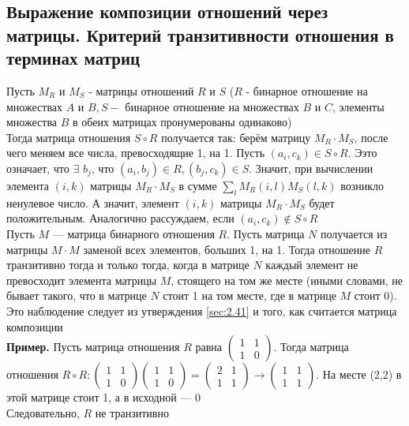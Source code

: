 \documentclass[a4paper]{article}
\begin{document}
\subsection{Выражение композиции отношений через матрицы. Критерий транзитивности отношения в терминах матриц}
Пусть $M_{R}$ и $M_{S}$ - матрицы отношений $R$ и $S$ ($R$ - бинарное отношение на множествах $A$ и $B, S-$ бинарное отношение на множествах $B$ и $C$, элементы множества $B$ в обеих матрицах пронумерованы одинаково)\\[2mm]
 Тогда матрица отношения $S \circ R$ получается так: берём матрицу $M_{R} \cdot M_{S}$, после чего меняем все числа, превосходящие 1, на 1. Пусть $\left(a_{i}, c_{k}\right) \in S \circ R$. Ээто означает, что $\exists$ $b_{j}$, что $\left(a_{i}, b_{j}\right) \in R,\left(b_{j}, c_{k}\right) \in S$. Значит, при вычислении элемента $(i, k)$ матрицы $M_{R} \cdot M_{S}$ в сумме $\sum_{l} M_{R}(i, l) M_{S}(l, k)$ возникло ненулевое число. А значит, элемент $(i, k)$ матрицы $M_{R} \cdot M_{S}$ будет положительным. Аналогично рассуждаем, если $\left(a_{i}, c_{k}\right) \notin S \circ R$\\[2mm]
 Пусть $M$ — матрица бинарного отношения $R$. Пусть матрица $N$ получается из матрицы $M\cdot M$ заменой всех элементов, больших 1, на 1. Тогда отношение $R$ транзитивно тогда и только тогда, когда в матрице $N$ каждый элемент не превосходит элемента матрицы $M$, стоящего на том же месте (иными словами, не бывает такого, что в матрице $N$ стоит 1 на том месте, где в матрице $M$ стоит 0). Это наблюдение следует из утверждения \ref{sec:2.41} и того, как считается матрица композиции\\[2mm]
\textbf{Пример.} Пусть матрица отношения $R$ равна $\begin{pmatrix}
    1&1\\
    1&0
\end{pmatrix}$. Тогда матрица отношения $R\circ R:\begin{pmatrix}
    1&1\\
    1&0
\end{pmatrix}\begin{pmatrix}
    1&1\\
    1&0
\end{pmatrix}=\begin{pmatrix}
    2&1\\
    1&1
\end{pmatrix}\rightarrow\begin{pmatrix}
    1&1\\
    1&1
\end{pmatrix}$. На месте (2,2) в этой матрице стоит 1, а в исходной — 0\\[2mm]
Следовательно, $R$ не транзитивно
\end{document}
